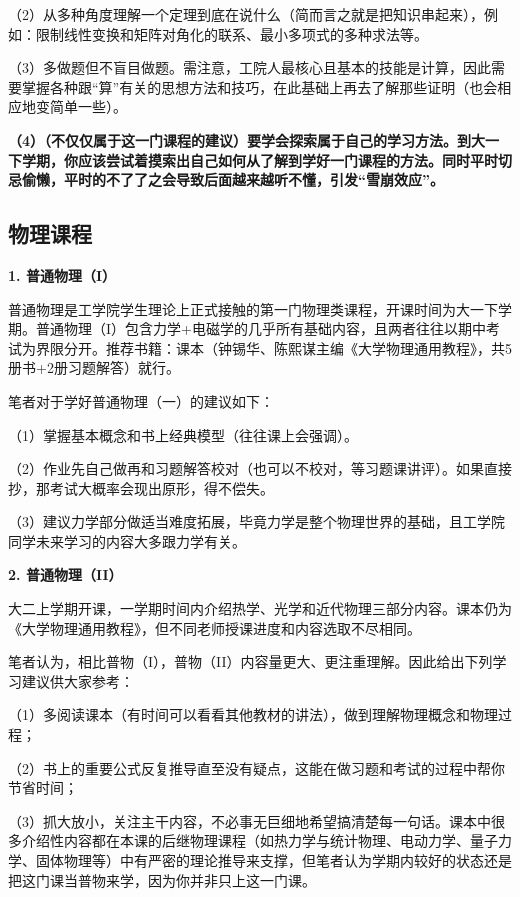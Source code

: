 \documentclass[11pt,oneside]{book}
\begin{document}
（2）从多种角度理解一个定理到底在说什么（简而言之就是把知识串起来），例如：限制线性变换和矩阵对角化的联系、最小多项式的多种求法等。

（3）多做题但不盲目做题。需注意，工院人最核心且基本的技能是计算，因此需要掌握各种跟“算”有关的思想方法和技巧，在此基础上再去了解那些证明（也会相应地变简单一些）。

\textbf{（4）}\textbf{\textbf{（不仅仅属于这一门课程的建议）}}\textbf{\textbf{要}}\textbf{\textbf{学会探索属于自己的学习方法。到大一下学期，你应该尝试着摸索出自己如何从了解到学好一门课程的方法。同时平时切忌偷懒，平时的不了了之会导致后面越来越听不懂，引发“雪崩效应”。}}

        \subsection{物理课程}
        \textbf{1. 普通物理（I）}

普通物理是工学院学生理论上正式接触的第一门物理类课程，开课时间为大一下学期。普通物理（I）包含力学+电磁学的几乎所有基础内容，且两者往往以期中考试为界限分开。推荐书籍：课本（钟锡华、陈熙谋主编《大学物理通用教程》，共5册书+2册习题解答）就行。

笔者对于学好普通物理（一）的建议如下：

（1）掌握基本概念和书上经典模型（往往课上会强调）。

（2）作业先自己做再和习题解答校对（也可以不校对，等习题课讲评）。如果直接抄，那考试大概率会现出原形，得不偿失。

（3）建议力学部分做适当难度拓展，毕竟力学是整个物理世界的基础，且工学院同学未来学习的内容大多跟力学有关。



 \textbf{2. 普通物理（II）}

大二上学期开课，一学期时间内介绍热学、光学和近代物理三部分内容。课本仍为《大学物理通用教程》，但不同老师授课进度和内容选取不尽相同。

笔者认为，相比普物（I），普物（II）内容量更大、更注重理解。因此给出下列学习建议供大家参考：

（1）多阅读课本（有时间可以看看其他教材的讲法），做到理解物理概念和物理过程；

（2）书上的重要公式反复推导直至没有疑点，这能在做习题和考试的过程中帮你节省时间；

（3）抓大放小，关注主干内容，不必事无巨细地希望搞清楚每一句话。课本中很多介绍性内容都在本课的后继物理课程（如热力学与统计物理、电动力学、量子力学、固体物理等）中有严密的理论推导来支撑，但笔者认为学期内较好的状态还是把这门课当普物来学，因为你并非只上这一门课。
\end{document}
